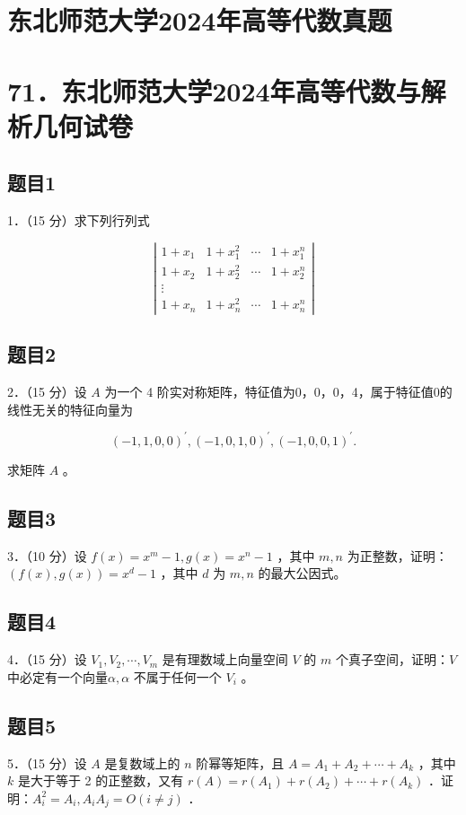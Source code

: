 \documentclass{article}
\begin{document}
\section*{东北师范大学2024年高等代数真题}
\section*{71．东北师范大学2024年高等代数与解析几何试卷}

\subsection{题目1}
1．（15 分）求下列行列式

\[
\left|\begin{array}{cccc}
1+x_{1} & 1+x_{1}^{2} & \cdots & 1+x_{1}^{n} \\
1+x_{2} & 1+x_{2}^{2} & \cdots & 1+x_{2}^{n} \\
\vdots & & & \\
1+x_{n} & 1+x_{n}^{2} & \cdots & 1+x_{n}^{n}
\end{array}\right|
\]

\subsection{题目2}
2．（15 分）设 \(A\) 为一个 4 阶实对称矩阵，特征值为0，0，0，4，属于特征值0的线性无关的特征向量为

\[
(-1,1,0,0)^{\prime},(-1,0,1,0)^{\prime},(-1,0,0,1)^{\prime} .
\]

求矩阵 \(A\) 。

\subsection{题目3}
3．（10 分）设 \(f(x)=x^{m}-1, g(x)=x^{n}-1\) ，其中 \(m, n\) 为正整数，证明：\((f(x), g(x))=x^{d}-1\) ，其中 \(d\) 为 \(m, n\) 的最大公因式。

\subsection{题目4}
4．（15 分）设 \(V_{1}, V_{2}, \cdots, V_{m}\) 是有理数域上向量空间 \(V\) 的 \(m\) 个真子空间，证明：\(V\) 中必定有一个向量\(\alpha, \alpha\) 不属于任何一个 \(V_{i}\) 。

\subsection{题目5}
5．（15 分）设 \(A\) 是复数域上的 \(n\) 阶幂等矩阵，且 \(A=A_{1}+A_{2}+\cdots+A_{k}\) ，其中 \(k\) 是大于等于 2 的正整数，又有 \(r(A)=r\left(A_{1}\right)+r\left(A_{2}\right)+\cdots+r\left(A_{k}\right)\) ．证明：\(A_{i}^{2}=A_{i}, A_{i} A_{j}=O(i \neq j)\) ．
\end{document}
